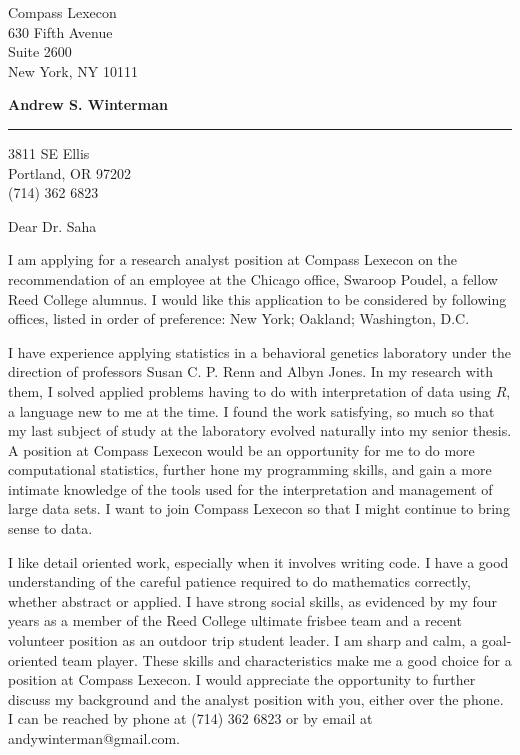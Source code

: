 \documentclass[11pt]{letter} %
\begin{document}
\longindentation=0pt                       %
\let\raggedleft\raggedright                %
 
\begin{letter}{
Compass Lexecon \\
630 Fifth Avenue\\
Suite 2600\\
New York, NY 10111\\
 }
 
\begin{center}
\large \bf{Andrew S. Winterman} \end{center}
\medskip\hrule height 1pt
\begin{center}
3811 SE Ellis \\ Portland, OR 97202 \\ (714) 362 6823
\end{center}  



\opening{Dear Dr. Saha} 
 
 I am applying for a research analyst position at Compass Lexecon on the recommendation of an employee at the Chicago office, Swaroop Poudel, a fellow Reed College alumnus. I would like this application to be considered by following offices, listed in order of preference: New York; Oakland; Washington, D.C.
  
I have experience applying statistics in a behavioral genetics laboratory under the direction of professors Susan C. P. Renn and Albyn Jones. In my research with them, I solved applied problems having to do with interpretation of data using $R$, a language new to me at the time. I found the work satisfying, so much so that my last subject of study at the laboratory evolved naturally into my senior thesis. A position at Compass Lexecon would be an opportunity for me to do more computational statistics, further hone my programming skills, and gain a more intimate knowledge of the tools used for the interpretation and management of large data sets. I want to join Compass Lexecon so that I might continue to bring sense to data. 
 
 I like detail oriented work, especially when it involves writing code. I have a good understanding of the careful patience required to do mathematics correctly, whether abstract or applied. I have strong social skills, as evidenced by my four years as a member of the Reed College ultimate frisbee team and a recent volunteer position as an outdoor trip student leader. I am sharp and calm, a goal-oriented team player. These skills and characteristics make me a good choice for a position at Compass Lexecon. I would appreciate the opportunity to further discuss my background and the analyst position with you, either over the phone.  I can be reached by phone at (714) 362 6823 or by email at andywinterman@gmail.com. 


\end{letter}
\end{document}
